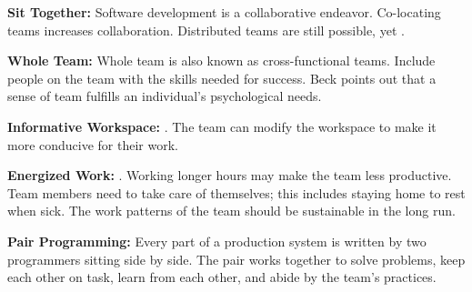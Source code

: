 \textbf{Sit Together:} Software development is a collaborative endeavor. Co-locating teams increases collaboration. Distributed teams are still possible, yet   \cite{BeckExtremeProgramming2004}. 


\textbf{Whole Team:} Whole team is also known as cross-functional teams. Include people on the team with the skills needed for success. Beck points out that a sense of team fulfills an individual's psychological needs.  \cite{BeckExtremeProgramming2004}
 


\textbf{Informative Workspace:}  \cite{BeckExtremeProgramming2004}. The team can modify the workspace to make it more conducive for their work. 


\textbf{Energized Work:}  \cite{BeckExtremeProgramming2004}. Working longer hours may make the team less productive. Team members need to take care of themselves; this includes staying home to rest when sick. The work patterns of the team should be sustainable in the long run.

\textbf{Pair Programming:} Every part of a production system is written by two programmers sitting side by side. The pair works together to solve problems, keep each other on task, learn from each other, and abide by the team's practices.

